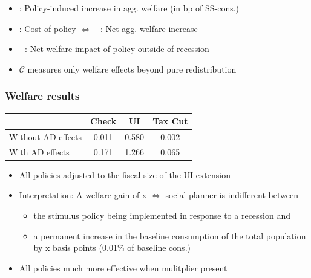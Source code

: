 \documentclass[pdflatex,aspectratio=169]{beamer}
\newcommand{\RNum}[1]{\uppercase\expandafter{\romannumeral #1\relax}}
\begin{document}
{\begin{frame}
	\begin{itemize}
		\item \RNum{1}: Policy-induced increase in agg. welfare (in bp of SS-cons.)
		\item \RNum{2}: Cost of policy $\Leftrightarrow$ \RNum{1} - \RNum{2}: Net agg. welfare increase
		\item \RNum{3} - \RNum{4}: Net welfare impact of policy outside of recession
		\item $\mathcal{C}$ measures only welfare effects beyond pure redistribution
	\end{itemize}
	
\end{frame}

}{}


\begin{frame}
	\frametitle{Welfare results}
	\centering 
	\begin{tabular}{@{}lccc@{}} 
		\toprule 
		& Check      & UI    & Tax Cut    \\  \midrule 
		Without AD effects & 0.011  & 0.580  & 0.002     \\ 
		With AD effects & 0.171  & 1.266  & 0.065     \\ 
	\end{tabular}  
	\medskip
	\begin{itemize}
		\itemsep = .75\bigskipamount 
		\item All policies adjusted to the fiscal size of the UI extension
		\item Interpretation: A welfare gain of x $\Leftrightarrow$ social planner is indifferent between 
		\begin{itemize}
			\itemsep = .25\bigskipamount 
			\item the stimulus policy being implemented in response to a recession and 
			\item a permanent increase in the baseline consumption of the total population by x basis points (0.01\% of baseline cons.)
		\end{itemize}
		\item All policies much more effective when mulitplier present
	\end{itemize}
\end{frame}
\end{document}
